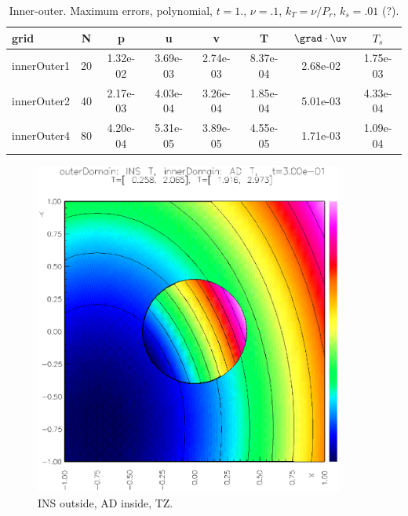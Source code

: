 \begin{table}[hbt]
\begin{center}
\begin{tabular}{|l|c|c|c|c|c|c|c|} \hline
grid        & N      &  p      &  u       & v        &  T       & $\grad\cdot\uv$  &  $T_s$            \\ \hline 
innerOuter1 &  20    & 1.32e-02 &  3.69e-03 &  2.74e-03 &  8.37e-04 &  2.68e-02   &    1.75e-03 \\
innerOuter2 &  40    & 2.17e-03 &  4.03e-04 &  3.26e-04 &  1.85e-04 &  5.01e-03   &    4.33e-04\\
innerOuter4 &  80    & 4.20e-04 &  5.31e-05 &  3.89e-05 &  4.55e-05 &  1.71e-03   &    1.09e-04\\\hline 
\end{tabular}
\caption{Inner-outer. Maximum errors, polynomial, $t=1.$, $\nu=.1$, $k_T=\nu/P_r$, $k_s=.01$ (?).}
\label{table:innerOuterTZ}
\end{center}
\end{table}


\begin{figure}
\begin{center}
  \includegraphics[width=4.0in]{innerOuterINS.AD.TZ.ps}
\end{center}
\caption{INS outside, AD inside, TZ.}
\label{fig:innerOuterTZ}
\end{figure}

